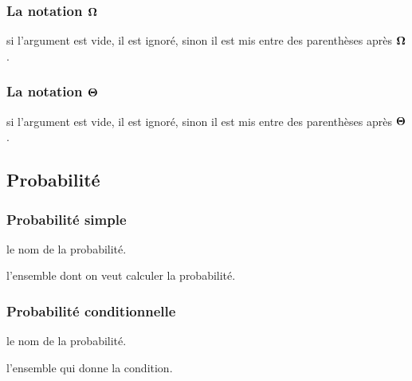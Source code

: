 \documentclass[12pt,a4paper]{article}
\theoremstyle{definition}
\begin{document}
\subsubsection{\texorpdfstring{La notation $\bigomega{}$}%
                          {La notation "grand Omega"}}


\IDarg{} si l'argument est vide, il est ignoré, sinon il est mis entre des parenthèses après $\bigomega{}$.





\subsubsection{\texorpdfstring{La notation $\bigtheta{}$}%
                          {La notation "grand Theta"}}


\IDarg{} si l'argument est vide, il est ignoré, sinon il est mis entre des parenthèses après $\bigtheta{}$.
\subsection{Probabilité}

\subsubsection{Probabilité \og simple \fg}


\IDoption{} le nom de la probabilité.

\IDarg{} l'ensemble dont on veut calculer la probabilité.





\subsubsection{Probabilité conditionnelle}





\IDoption{} le nom de la probabilité.

 l'ensemble qui donne la condition.
\end{document}
